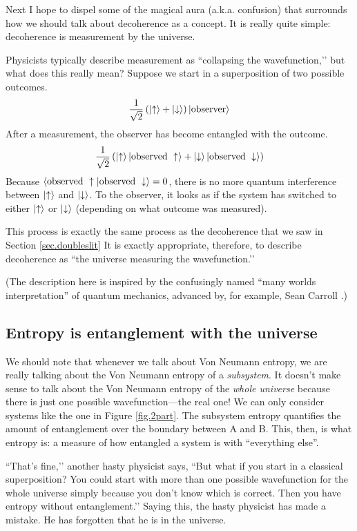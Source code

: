 Next I hope to dispel some of the magical aura (a.k.a. confusion) that surrounds how we should talk about decoherence as a concept. It is really quite simple: decoherence is measurement by the universe.

Physicists typically describe measurement as ``collapsing the wavefunction,’’ but what does this really mean? Suppose we start in a superposition of two possible outcomes.
\[
\frac{1}{\sqrt{2}}\left(\left|\uparrow\right\rangle + \left|\downarrow\right\rangle\right)\left|\text{observer}\right\rangle
\]
After a measurement, the observer has become entangled with the outcome.
\[
\frac{1}{\sqrt{2}}\left(\left|\uparrow\right\rangle\left|\text{observed }\uparrow\right\rangle + \left|\downarrow\right\rangle\left|\text{observed }\downarrow\right\rangle\right)
\]
Because \(\left\langle\text{observed }\uparrow|\text{observed }\downarrow\right\rangle=0\), there is no more quantum interference between \(\left|\uparrow\right\rangle\) and \(\left|\downarrow\right\rangle\). To the observer, it looks as if the system has switched to either \(\left|\uparrow\right\rangle\) or \(\left|\downarrow\right\rangle\) (depending on what outcome was measured).

This process is exactly the same process as the decoherence that we saw in Section \ref{sec.doubleslit} It is exactly appropriate, therefore, to describe decoherence as ``the universe measuring the wavefunction.’’

(The description here is inspired by the confusingly named ``many worlds interpretation'' of quantum mechanics, advanced by, for example, Sean Carroll \cite{Carroll}.)

\subsection{Entropy is entanglement with the universe}

We should note that whenever we talk about Von Neumann entropy, we are really talking about the Von Neumann entropy of a \emph{subsystem}. It doesn’t make sense to talk about the Von Neumann entropy of the \emph{whole universe} because there is just one possible wavefunction—the real one! We can only consider systems like the one in Figure \ref{fig.2part}. The subsystem entropy quantifies the amount of entanglement over the boundary between A and B. This, then, is what entropy is: a measure of how entangled a system is with ``everything else''.

``That’s fine,’’ another hasty physicist says, ``But what if you start in a classical superposition? You could start with more than one possible wavefunction for the whole universe simply because you don’t know which is correct. Then you have entropy without entanglement.’’ Saying this, the hasty physicist has made a mistake. He has forgotten that he is in the universe.

